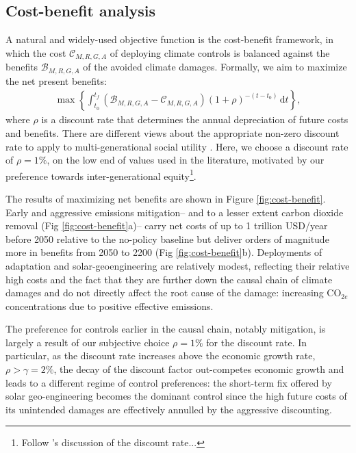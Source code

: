 \documentclass[9pt,twocolumn,twoside,lineno]{pnas-new}
\begin{document}
\subsection*{Cost-benefit analysis}\label{sec:cost-benefit}

A natural and widely-used objective function is the cost-benefit framework, in which the cost $\mathcal{C}_{M, R, G, A}$ of deploying climate controls is balanced against the benefits $\mathcal{B}_{M, R, G, A}$ of the avoided climate damages. Formally, we aim to maximize the net present benefits:
\begin{gather}
    \max \left\{ \int_{t_{0}}^{t_{f}} 
    \left(\mathcal{B}_{M, R, G, A} - \mathcal{C}_{M, R, G, A} \right) (1 + \rho)^{-(t-t_{0})} \, \text{d}t \right\},
    \label{eq.net_present_benefits}
\end{gather}
where $\rho$ is a discount rate that determines the annual depreciation of future costs and benefits. There are different views about the appropriate non-zero discount rate to apply to multi-generational social utility \cite{ramsey_mathematical_1928, solow_economics_1974, stern_economics_2007}. Here, we choose a discount rate of $\rho = 1\%$, on the low end of values used in the literature, motivated by our preference towards inter-generational equity\footnote{Follow \cite{stern_economics_2007}'s discussion of the discount rate...}.

The results of maximizing net benefits are shown in Figure \ref{fig:cost-benefit}. Early and aggressive emissions mitigation– and to a lesser extent carbon dioxide removal (Fig \ref{fig:cost-benefit}a)– carry net costs of up to 1 trillion USD/year before 2050 relative to the no-policy baseline but deliver orders of magnitude more in benefits from 2050 to 2200 (Fig \ref{fig:cost-benefit}b). Deployments of adaptation and solar-geoengineering are relatively modest, reflecting their relative high costs and the fact that they are further down the causal chain of climate damages and do not directly affect the root cause of the damage: increasing CO$_{2e}$ concentrations due to positive effective emissions.

The preference for controls earlier in the causal chain, notably mitigation, is largely a result of our subjective choice $\rho = 1\%$ for the discount rate. In particular, as the discount rate increases above the economic growth rate, $\rho > \gamma = 2\%$, the decay of the discount factor out-competes economic growth and leads to a different regime of control preferences: the short-term fix offered by solar geo-engineering becomes the dominant control since the high future costs of its unintended damages are effectively annulled by the aggressive discounting.
\end{document}
